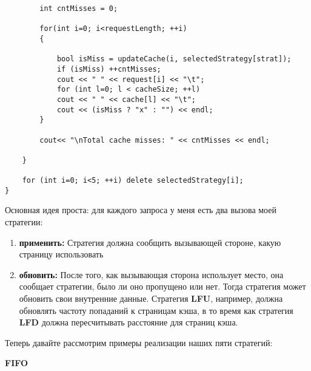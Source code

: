 \begin{tcolorbox}
\begin{verbatim}
        int cntMisses = 0;
        
        for(int i=0; i<requestLength; ++i)
        {
        
            bool isMiss = updateCache(i, selectedStrategy[strat]);
            if (isMiss) ++cntMisses;
            cout << " " << request[i] << "\t";
            for (int l=0; l < cacheSize; ++l) 
            cout << " " << cache[l] << "\t";
            cout << (isMiss ? "x" : "") << endl;
        }
        
        cout<< "\nTotal cache misses: " << cntMisses << endl;
        
    }
    
    for (int i=0; i<5; ++i) delete selectedStrategy[i];
}

\end{verbatim}
\end{tcolorbox}

Основная идея проста: для каждого запроса у меня есть два вызова моей стратегии:
\begin{enumerate}
    \item \textbf{применить:} Стратегия должна сообщить вызывающей стороне, какую страницу использовать
    \item \textbf{обновить:} После того, как вызывающая сторона использует место, она сообщает стратегии, было ли оно пропущено или нет. Тогда стратегия может обновить свои внутренние данные. Стратегия \textbf{LFU}, например, должна обновлять частоту попаданий к страницам кэша, в то время как стратегия \textbf{LFD} должна пересчитывать расстояние для страниц кэша.
\end{enumerate}

\vspace{\baselineskip}

Теперь давайте рассмотрим примеры реализации наших пяти стратегий:

\vspace{\baselineskip}
\textbf{FIFO}

